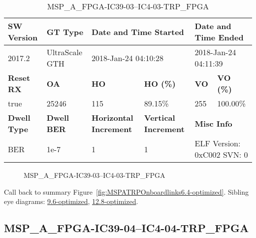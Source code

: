 \begin{table}[h]
\centering
\caption{MSP\_A\_FPGA-IC39-03--IC4-03-TRP\_FPGA}
\label{tab:MSPAFPGAIC3903IC403TRPFPGA6.4-optimized}
\begin{tabular}{@{}|l|l|l|l|l|l|@{}}
\toprule
\textbf{SW Version}                & \textbf{GT Type}   & \multicolumn{2}{l|}{\textbf{Date and Time Started}}            & \multicolumn{2}{l|}{\textbf{Date and Time Ended}}        \\ \midrule
2017.2                       & UltraScale GTH          & \multicolumn{2}{l|}{2018-Jan-24 04:10:28}                   & \multicolumn{2}{l|}{2018-Jan-24 04:11:39}               \\ \midrule
\textbf{Reset RX}                  & \textbf{OA} & \textbf{HO}   & \textbf{HO (\%)} & \textbf{VO} & \textbf{VO (\%)} \\ \midrule
true & 25246        & 115          & 89.15\%        & 255        & 100.00\%       \\ \midrule
\textbf{Dwell Type}                & \textbf{Dwell BER} & \textbf{Horizontal Increment} & \textbf{Vertical Increment}    & \multicolumn{2}{l|}{\textbf{Misc Info}}                  \\ \midrule
BER                            & 1e-7        & 1        & 1           & \multicolumn{2}{l|}{ELF Version: 0xC002 SVN: 0}                         \\ \bottomrule
\end{tabular}
\end{table}

\begin{figure}[h]
\caption{MSP\_A\_FPGA-IC39-03--IC4-03-TRP\_FPGA} \label{fig:MSPAFPGAIC3903IC403TRPFPGA6.4-optimized}
\end{figure}

Call back to summary Figure~\ref{fig:MSPATRPOnboardlinks6.4-optimized}.
Sibling eye diagrams: \hyperref[sec:MSPAFPGAIC3903IC403TRPFPGA9.6-optimized]{9.6-optimized}, \hyperref[sec:MSPAFPGAIC3903IC403TRPFPGA12.8-optimized]{12.8-optimized}.

\clearpage
\newpage


\subsection{MSP\_A\_FPGA-IC39-04--IC4-04-TRP\_FPGA}\label{sec:MSPAFPGAIC3904IC404TRPFPGA6.4-optimized}

